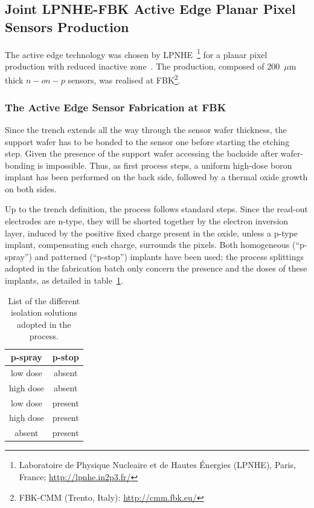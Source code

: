 \subsection{Joint LPNHE-FBK  Active Edge Planar Pixel Sensors Production}
The active edge technology was chosen  by LPNHE~\footnote{Laboratoire de Physique Nucleaire et de Hautes \'Energies (LPNHE), Paris, France; \url{http://lpnhe.in2p3.fr/}} for a  planar pixel production
 with reduced inactive zone~\cite{bib:nim2012}.
The production, composed of 200~$\mu$m thick $n-on-p$ sensors, was realised at FBK\footnote{FBK-CMM (Trento, Italy): \url{http://cmm.fbk.eu/}}.

\subsubsection{The Active Edge Sensor Fabrication at FBK}
Since the trench extends all the way through the sensor wafer thickness, the support wafer has to 
be bonded to the sensor one before starting the etching step.
Given the presence of the  support wafer  accessing the backside  after wafer-bonding is impossible.
Thus, as first process steps, a uniform high-dose boron implant has been performed on the back side, 
followed by a thermal oxide growth on
both sides.

Up to the trench definition, the process follows standard steps. Since the read-out electrodes are n-type, they will be shorted together by the electron
inversion layer, induced by the positive fixed charge present in the oxide, unless a p-type implant, compensating such charge, surrounds the pixels.
Both homogeneous (``p-spray'') and patterned (``p-stop'') implants have been used;
the process splittings adopted in the fabrication batch only concern the presence and the doses of these implants,  as detailed in table~\ref{tab:isolation}.



\begin{table}[!htpb]
\caption{\label{tab:isolation}List of the different isolation solutions adopted in the process.}
\begin{center}
\begin{tabular}{cc}
\hline
p-spray    & p-stop \\
\hline
\hline
  low dose &      absent\\
  high   dose  &   absent\\
  low   dose &     present\\
  high  dose  &   present\\
  absent  &   present
\end{tabular}
\end{center}
\end{table}

